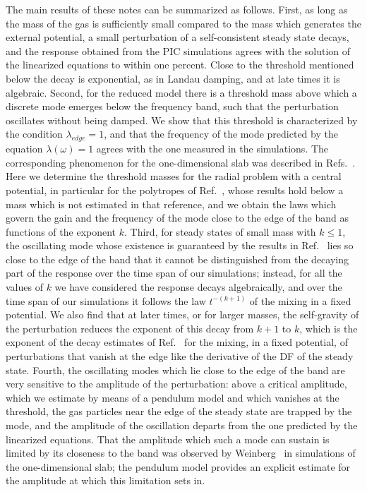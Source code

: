 The main results of these notes can be summarized as follows. First, as long as the mass of the gas is sufficiently small compared to the mass which generates the external potential, a small perturbation of a self-consistent steady state decays, and the response obtained from the PIC simulations agrees with the solution of the linearized equations to within one percent. Close to the threshold mentioned below the decay is exponential, as in Landau damping, and at late times it is algebraic. Second, for the reduced model there is a threshold mass above which a discrete mode emerges below the frequency band, such that the perturbation oscillates without being damped. We show that this threshold is characterized by the condition $\lambda_{edge} = 1$, and that the frequency of the mode predicted by the equation $\lambda(\omega) = 1$ agrees with the one measured in the simulations. The corresponding phenomenon for the one-dimensional slab was described in Refs.~\cite{mW91,pL92}. Here we determine the threshold masses for the radial problem with a central potential, in particular for the polytropes of Ref.~\cite{mHgRmScS25}, whose results hold below a mass which is not estimated in that reference, and we obtain the laws which govern the gain and the frequency of the mode close to the edge of the band as functions of the exponent $k$. Third, for steady states of small mass with $k\leq 1$, the oscillating mode whose existence is guaranteed by the results in Ref.~\cite{mHgRmScS25} lies so close to the edge of the band that it cannot be distinguished from the decaying part of the response over the time span of our simulations; instead, for all the values of $k$ we have considered the response decays algebraically, and over the time span of our simulations it follows the law $t^{-(k+1)}$ of the mixing in a fixed potential. We also find that at later times, or for larger masses, the self-gravity of the perturbation reduces the exponent of this decay from $k+1$ to $k$, which is the exponent of the decay estimates of Ref.~\cite{mHgRmScS24} for the mixing, in a fixed potential, of perturbations that vanish at the edge like the derivative of the DF of the steady state. Fourth, the oscillating modes which lie close to the edge of the band are very sensitive to the amplitude of the perturbation: above a critical amplitude, which we estimate by means of a pendulum model and which vanishes at the threshold, the gas particles near the edge of the steady state are trapped by the mode, and the amplitude of the oscillation departs from the one predicted by the linearized equations. That the amplitude which such a mode can sustain is limited by its closeness to the band was observed by Weinberg~\cite{mW91} in simulations of the one-dimensional slab; the pendulum model provides an explicit estimate for the amplitude at which this limitation sets in.


